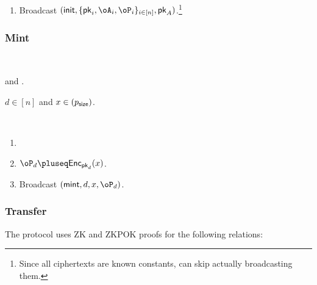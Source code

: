 \begin{protocol}
\begin{enumerate}
\begin{enumerate}
\begin{enumerate}
					\item $\oP_i\getsr \Enc_{\pk_i}(0;0),\oA_i\getsr \Enc_{\pk_i}(0;0),\tcount_i,\gcount_i 
					\asn 0$. 
					
			
				\end{enumerate}
			
		\item Broadcast $(\init,\sset{\pk_i,\oA_i,\oP_i}_{i\in [n]},\pk_A)$.\footnote{Since all ciphertexts are known constants, \Cc can skip actually broadcasting them.}
				\end{enumerate}								
			\end{enumerate}
\end{protocol}

\subsubsection{Mint}

\begin{protocol}~\label{prot:ConfidentialTransactions:Mint}
	\item[Parties:] \Mc and \Cc.
	
	
	
	\item[Common input:]  $d\in [n]$ and $x\in (p_{\mathsf{size}})$.
	
	\item[Operation:]  \Cc~
		\begin{enumerate}
			\item {}
			
			\item  $\oP_d \pluseq \Enc_{\pk_d}(x)$.
				
			
			\item Broadcast 	 	$(\mint,d,x,\oP_d)$.
		
	\end{enumerate}
\end{protocol}

\subsubsection{Transfer}

The protocol uses ZK and ZKPOK proofs for the   following  relations:

